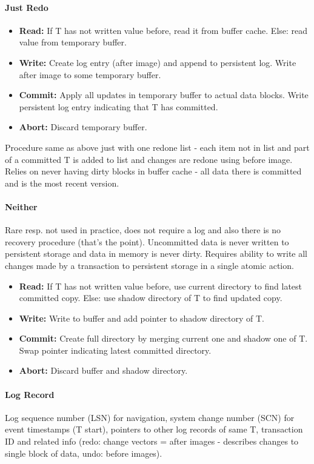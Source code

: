 \paragraph{Just Redo}
\begin{itemize}
    \item \textbf{Read:} If T has not written value before, read it from buffer cache. Else: read value from temporary buffer.
    \item \textbf{Write:} Create log entry (after image) and append to persistent log. Write after image to some temporary buffer.
    \item \textbf{Commit:} Apply all updates in temporary buffer to actual data blocks. Write persistent log entry indicating that T has committed.
    \item \textbf{Abort:} Discard temporary buffer.
\end{itemize}
Procedure same as above just with one redone list - each item not in list and part of a committed T is added to list and changes are redone using before image. Relies on never having dirty blocks in buffer cache - all data there is committed and is the most recent version. %

\paragraph{Neither}
Rare resp. not used in practice, does not require a log and also there is no recovery procedure (that's the point). Uncommitted data is never written to persistent storage and data in memory is never dirty. Requires ability to write all changes made by a transaction to persistent storage in a single atomic action. %
\begin{itemize}
    \item \textbf{Read:} If T has not written value before, use current directory to find latest committed copy. Else: use shadow directory of T to find updated copy.
    \item \textbf{Write:} Write to buffer and add pointer to shadow directory of T.
    \item \textbf{Commit:} Create full directory by merging current one and shadow one of T. Swap pointer indicating latest committed directory.
    \item \textbf{Abort:} Discard buffer and shadow directory.
\end{itemize} %

\paragraph{Log Record}
Log sequence number (LSN) for navigation, system change number (SCN) for event timestamps (T start), pointers to other log records of same T, transaction ID and related info (redo: change vectors = after images - describes changes to single block of data, undo: before images).

